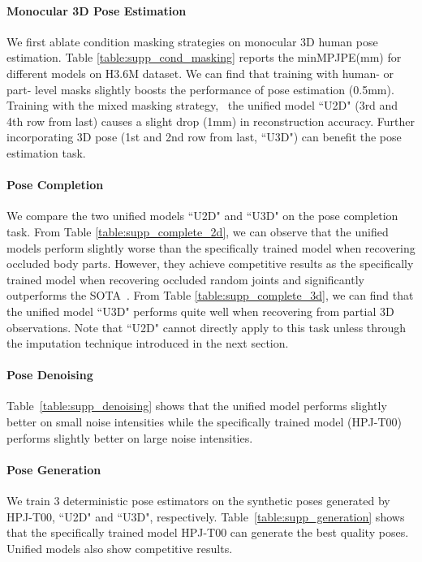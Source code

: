 \documentclass[10pt,twocolumn,letterpaper]{article}
\begin{document}
\paragraph{Monocular 3D Pose Estimation} We first ablate condition masking strategies on monocular 3D human pose estimation. Table \ref{table:supp_cond_masking} reports the minMPJPE(mm) for different models on H3.6M dataset.  We can find that training with human- or part- level masks slightly boosts the performance of pose estimation (0.5mm). Training with the mixed masking strategy, \ie \ the unified model ``U2D" (3rd and 4th row from last) causes a slight drop (1mm) in reconstruction accuracy. Further incorporating 3D pose  (1st and 2nd row from last, ``U3D") can benefit the pose estimation task. 


\paragraph{Pose Completion}
We compare the two unified models ``U2D" and ``U3D" on the pose completion task. From Table \ref{table:supp_complete_2d}, we can observe that the unified models perform slightly worse than the specifically trained model when recovering occluded body parts. However, they achieve competitive results as the specifically trained model when recovering occluded random joints and significantly outperforms the SOTA~\cite{Li_2019_CVPR}.
From Table \ref{table:supp_complete_3d}, we can find that the unified model ``U3D" performs quite well when recovering from partial 3D observations. Note that ``U2D" cannot directly apply to this task unless through the imputation technique introduced in the next section.

\paragraph{Pose Denoising}
Table~\ref{table:supp_denoising} shows that the unified model performs slightly better on small noise intensities while the specifically trained model (HPJ-T00) performs slightly better on large noise intensities. 

\paragraph{Pose Generation}
We train 3 deterministic pose estimators on the synthetic poses generated by HPJ-T00, ``U2D" and ``U3D", respectively. Table~\ref{table:supp_generation} shows that the specifically trained model HPJ-T00 can generate the best quality poses. Unified models also show competitive results.
\end{document}
